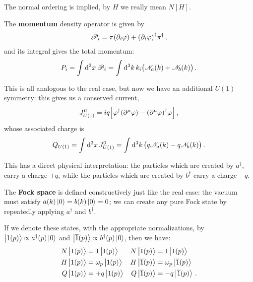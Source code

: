\documentclass[main.tex]{subfiles}
\begin{document}
The normal ordering is implied, by \(H\) we really mean \(N[H]\).

The \textbf{momentum} density operator is given by 
%
\begin{align}
\mathscr{P}_{i} = \pi \qty(\partial_{i} \varphi )
+ \qty(\partial_{i} \varphi ) ^\dag \pi ^\dag
\,,
\end{align}
%
and its integral gives the total momentum: 
%
\begin{align}
P_i = \int \dd[3]{x} \mathscr{P}_{i} = \int \dd[3]{k} k_i \qty(\mathscr{N}_a (k) + \mathscr{N}_b (k))
\,.
\end{align}

This is all analogous to the real case, but now we have an additional \(U(1)\) symmetry: this gives us a conserved current, 
%
\begin{align}
J^{\mu }_{U(1)} = i q \qty[ \varphi ^\dag \qty(\partial^{\mu } \varphi )
- \qty(\partial^{\mu } \varphi )^\dag \varphi ] 
\,,
\end{align}
%
whose associated charge is 
%
\begin{align}
Q_{U(1)} = \int \dd[3]{x} J^{0}_{U(1)}
= \int \dd[3]{k} \qty(q \mathscr{N}_a (k) - q \mathscr{N}_b(k))
\,.
\end{align}

This has a direct physical interpretation: the particles which are created by \(a ^\dag\), carry a charge \(+q\), while the particles which are created by \(b ^\dag\) carry a charge \(-q\). 

The \textbf{Fock space} is defined constructively just like the real case: the vacuum must satisfy \(a (k) \ket{0} = b(k) \ket{0} = 0\); we can create any pure Fock state by repeatedly applying \(a ^\dag\) and \(b ^\dag\). 


\begin{claim}
If we denote these states, with the appropriate normalizations, by \(\ket{1(p)} \propto a ^\dag (p) \ket{0}\) and \(\ket{\overline{1} (p)} \propto b ^\dag(p) \ket{0}\), then we have: 
%
\begin{subequations}
\begin{align} \label{eq:fock-one-particle-state-properties}
N \ket{1 (p)} &= 1 \ket{1 (p)} &
N \ket{\overline{1} (p)} &= 1 \ket{\overline{1} (p)}  \\
H \ket{1 (p)} &= \omega_{p} \ket{1 (p)} &
H \ket{\overline{1} (p)} &= \omega_{p} \ket{\overline{1} (p)}  \\
Q \ket{1 (p)} &= +q \ket{1 (p)} &
Q \ket{\overline{1} (p)} &= -q \ket{\overline{1} (p)}  
\,.
\end{align}
\end{subequations}
\end{claim}
\end{document}
